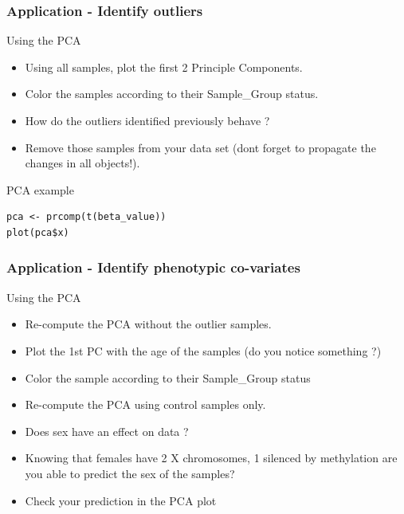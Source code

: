 \documentclass[10pt]{beamer}
\newenvironment{xframe}[2][]
  {\begin{frame}[fragile,environment=xframe,#1]
  \frametitle{#2}}
  {\end{frame}}
\begin{document}

\begin{xframe}{Application - Identify outliers}
  \begin{block}{Using the PCA}
    \begin{itemize}
      \item Using all samples, plot the first 2 Principle Components.
      \item Color the samples according to their Sample\_Group status. 
      \item How do the outliers identified previously behave ?
      \item Remove those samples from your data set (dont forget to propagate
      the changes in all objects!).
    \end{itemize}
  \end{block}
   \begin{exampleblock}{PCA example}
\begin{verbatim}
pca <- prcomp(t(beta_value))
plot(pca$x)
\end{verbatim}  
  \end{exampleblock}
\end{xframe}


\begin{xframe}{Application - Identify phenotypic co-variates}
  \begin{block}{Using the PCA}
    \begin{itemize}
      \item Re-compute the PCA without the outlier samples.
      \item Plot the 1st PC with the age of the samples (do you notice
      something ?)
      \item Color the sample according to their Sample\_Group status
      \item Re-compute the PCA using {\sf control} samples only.
	  \item Does sex have an effect on data ?
	  \item Knowing that females have 2 X chromosomes, 1 silenced by methylation
	  are you able to predict the sex of the samples?
	  \item Check your prediction in the PCA plot
    \end{itemize}
      \end{block}

\end{xframe}
\end{document}

